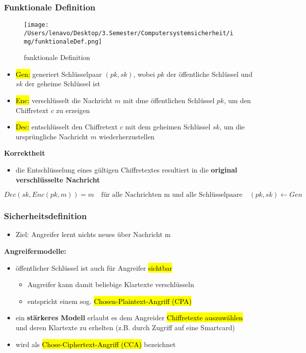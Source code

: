 \documentclass[a4paper, 10pt]{article}
\begin{document}
\subsubsection{Funktionale Definition}
\begin{figure}[h]
    \centering
    \texttt{[image: /Users/lenavo/Desktop/3.Semester/Computersystemsicherheit/img/funktionaleDef.png]}
    \caption{funktionale Definition}
    \label{fig:enter-label}
\end{figure}
\begin{itemize}
    \item \hl{Gen:} generiert Schlüsselpaar $(pk,sk)$, wobei $pk$ der öffentliche Schlüssel und $sk$ der geheime Schlüssel ist
    \item \hl{Enc:} verschlüsselt die Nachricht $m$ mit dme öffentlichen Schlüssel $pk$, um den Chiffretext $c$ zu erzeigen
    \item \hl{Dec:} entschlüsselt den Chiffretext $c$ mit dem geheimen Schlüssel $sk$, um die ursprüngliche Nachricht $m$ wiederherzustellen
\end{itemize}
\textbf{Korrektheit}
\begin{itemize}
    \item die Entschlüsselung eines gültigen Chiffretextes resultiert in die \textbf{original verschlüsselte Nachricht}
\end{itemize}
\[
    Dec(sk, Enc(pk,m)) = m \quad \text{für alle Nachrichten m und alle Schlüsselpaare} \quad (pk,sk) \leftarrow Gen
\] 
\subsubsection{Sicherheitsdefinition}
\begin{itemize}
    \item Ziel: Angreifer lernt nichts neues über Nachricht m
\end{itemize}
\textbf{Angreifermodelle:}
\begin{itemize}
    \item öffentlicher Schlüssel ist auch für Angreifer \hl{sichtbar}
    \begin{itemize}
        \item Angreifer kann damit beliebige Klartexte verschlüsseln
        \item entspricht einem sog. \hl{Chosen-Plaintext-Angriff (CPA)}
    \end{itemize}

    \item ein \textbf{stärkeres Modell} erlaubt es dem Angreider \hl{Chiffretexte auszuwählen} und deren Klartexte zu erhelten (z.B. durch Zugriff auf eine Smartcard)
    \item wird als \hl{Chose-Ciphertext-Angriff (CCA)} bezeichnet 
\end{itemize}
\end{document}
